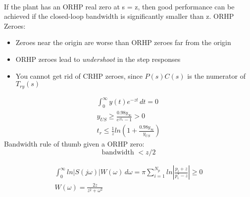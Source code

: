 \documentclass[12pt]{article}
\begin{document}
\begin{multicols*}{2}
    \underline{} \\
    If the plant has an ORHP real zero at s = z, then good performance can be achieved if the closed-loop bandwidth is significantly smaller than z. ORHP Zeroes:
    \begin{itemize}
        \item Zeroes near the origin are worse than ORHP zeroes far from the origin
        \item ORHP zeroes lead to \textit{undershoot} in the step responses
        \item You cannot get rid of CRHP zeroes, since \(P(s)C(s)\) is the numerator of \(T_{ry}(s)\)
    \end{itemize}
    \underline{}
    \begin{gather*}
        \int_{0}^{\infty} y(t)e^{-zt} \,dt = 0 \\
        y_{US} \geq \frac{0.98y_\infty}{e^{zt_s} - 1} > 0 \\
        t_r \leq \frac{1}{z} ln \left( 1 + \frac{0.98y_\infty}{y_{US}} \right)
    \end{gather*}
    Bandwidth rule of thumb given a ORHP zero:
    \[ \text{bandwidth } < z/2 \]

    \underline{}
    \begin{gather*}
        \int_{0}^{\infty} ln|S(j\omega)|W(\omega) \,d\omega = \pi\sum_{i = 1}^{N_p} ln\left| \frac{p_i + z}{p_i^* - z} \right| \geq 0 \\
        W(\omega) = \frac{2 z}{ z^2 + \omega ^ 2}
    \end{gather*}



\end{multicols*}
\end{document}
